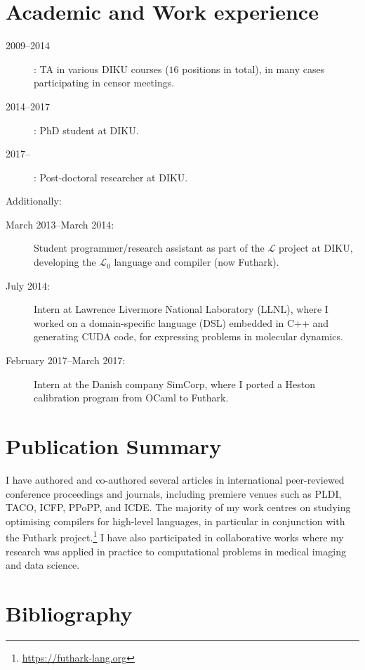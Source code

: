 \documentclass{resume} %
\renewcommand{\L}{$\mathcal{L}$}
\newcommand{\LO}{$\mathcal{L}_0$}
\begin{document}
\section{Academic and Work experience}

\begin{description}
\item[2009--2014]: TA in various DIKU courses ($16$ positions in
  total), in many cases participating in censor meetings.
\item[2014--2017]: PhD student at DIKU.
\item[2017--]: Post-doctoral researcher at DIKU.
\end{description}

Additionally:

\begin{description}
\item[March 2013--March 2014:] Student programmer/research assistant as
  part of the \L{} project at DIKU, developing the \LO{} language and
  compiler (now Futhark).
\item[July 2014:] Intern at Lawrence Livermore National Laboratory
  (LLNL), where I worked on a domain-specific language (DSL) embedded
  in C++ and generating CUDA code, for expressing problems in
  molecular dynamics.
\item[February 2017--March 2017:] Intern at the Danish company
  SimCorp, where I ported a Heston calibration program from OCaml to
  Futhark.
\end{description}

\section{Publication Summary}

I have authored and co-authored several articles in international
peer-reviewed conference proceedings and journals, including premiere
venues such as PLDI, TACO, ICFP, PPoPP, and ICDE.  The majority of my
work centres on studying optimising compilers for high-level
languages, in particular in conjunction with the Futhark
project.\footnote{\url{https://futhark-lang.org}} I have also
participated in collaborative works where my research was applied in
practice to computational problems in medical imaging and data
science.

\newpage

\section{Bibliography}

\nocite{*}


\end{document}
